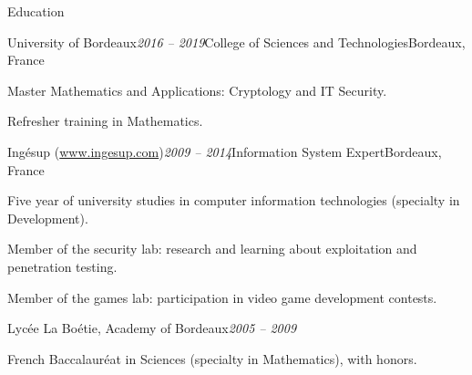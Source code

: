 \begin{rSection}{Education}

  \begin{rSubsection}{University of Bordeaux}{\em 2016 -- 2019}{College of Sciences and Technologies}{Bordeaux, France}
    \item Master Mathematics and Applications: Cryptology and IT Security.
    \item Refresher training in Mathematics.
  \end{rSubsection}

  \begin{rSubsection}{Ingésup (\href{www.ingesup.com}{www.ingesup.com})}{\em 2009 -- 2014}{Information System Expert}{Bordeaux, France}
    \item[] Five year of university studies in computer information technologies (specialty in Development).
    \item Member of the security lab: research and learning about exploitation and penetration testing.
    \item Member of the games lab: participation in video game development contests.
  \end{rSubsection}

  \begin{rSubsection}{Lycée La Boétie, Academy of Bordeaux}{\em 2005 -- 2009}{}{}
    \item[] French Baccalauréat in Sciences (specialty in Mathematics), with honors.
  \end{rSubsection}

\end{rSection}
